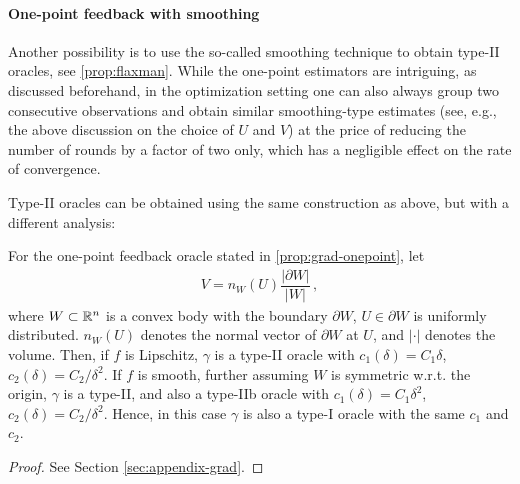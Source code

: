 \paragraph{One-point feedback with smoothing}
Another possibility is to use the so-called smoothing technique
\citep{PoTsy90,flaxman2005online,HaLe14:SOC}
to obtain type-II oracles, see \cref{prop:flaxman}.
While the one-point estimators are intriguing, as discussed beforehand,
in the optimization setting one can also always group two consecutive observations and obtain similar smoothing-type estimates (see, e.g., the above discussion on the choice of $U$ and $V$)
at the price of reducing the number of rounds by a factor of two only, which has a negligible effect on the rate of convergence.

Type-II oracles can be obtained using the same construction as above, but with a different analysis:
\begin{proposition}
\label{prop:flaxman}
For the one-point feedback oracle stated in \cref{prop:grad-onepoint}, let
\begin{align*}
V = n_W(U)\dfrac{\lvert \partial W\rvert}{\lvert W \rvert}\,,
\end{align*}
where $W \subset \mathbb{R}^n$ is a convex body with the boundary $\partial W$, $U \in \partial W$ is uniformly distributed. $n_W(U)$ denotes the normal vector of $\partial W$ at $U$, and $\lvert \cdot \rvert$ denotes the volume.
Then, if $f$ is Lipschitz, $\gamma$ is a type-II oracle with $c_1(\delta)=C_1 \delta$, $c_2(\delta) = C_2/\delta^2$.
If $f$ is smooth, further assuming $W$ is symmetric w.r.t. the origin, $\gamma$ is a type-II, and also a type-IIb oracle with $c_1(\delta) = C_1\delta^2$, $c_2(\delta) = C_2/\delta^2$. Hence, in this case $\gamma$ is also a type-I oracle with the same $c_1$ and $c_2$.
\end{proposition}
\begin{proof}
See Section \ref{sec:appendix-grad}.
\end{proof}



